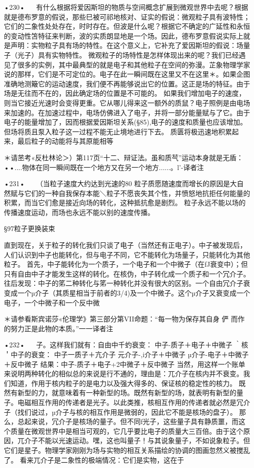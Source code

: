 •230•
  
有什么根据将爱因斯坦的物质与空间概念扩展到微观世界中去呢？根据就是德布罗意的假说，那些巳被可祁地核对、证实的假说：微观粒子具有波特性；它们的二象性处处存在，时时存在。但波是什么呢？根据它不确定的广延性和永恒的变动性笘特征来判断，波的实质朗显地是一个场。因此，德布罗意假说实际上就是声明：实物粒子具有场的特性。在这个意义上，它补充了爱因斯坦的假说：场量子（光子）具有实物特性。
微观粒子的场特性是怎样体现出来的呢？我们已经遇见了很多的实例，其中最典型的就是电子和其他粒子在空间的弥漫。芷象物理学家说的那样，它们是不可定位的。电子在此一瞬间既在这里又不在这里＊。如果企图准确地测簸它的运动速度，我们便不再能够说出它的位置。这正是场的特征。由于场是无往而不在的，因此确定场的位置是不可能的。
如果我们增加电子的速度，则当它接近光速时会变得更重。它从哪儿得来这一额外的质鼠？电子照例是由电场来加速的。在加速过程中，电场仿佛进入了电子，并将一部分能量赋与了它。由于电子的能量增加了，因而根据爱因斯坦关系(§85),电子的速度和质量也应该增加。
但场将质且泵入粒子这一过程不能无止境地进行下去。
质匮将极迅速地积累起来，最后粒子的动能将与其原能相等

＊请苤考«反杜林论＞）第117页“十二、辩证法。虽和质芞”运动本身就是无盾：••....物体在同一瞬间既在一个地方又在另一个地方......。l'-译者注

•231•
  
（当粒子速度大约达到光速的80%
粒子质愿随速度而增长的原因是大自然赋与它们的一种自我保存本能＼粒子不愿丧失其个性，并愤怒地抗拒任何能量的积累，而当它们愈是接近向场的转化，这种抵抗愈是剧烈。
粒子永远不能以场的传播速度运动，而场也永远不能以别的速度传播。

§97粒子更换装束

直到现在，关于粒子的转化我们只谈了电子（当然还有正电子）。中子被发现后，人们认识到中子也能转化，但与电子不同，它不能转化为场量子，只能转化为其他粒子。
首先，中子能转化为一个质子，一个电子和一个中微子（在fJ衰变中）；但只有自由中子才能发生这样的转化。在核伪，中子转化成一个质子和一个冗介子。往后发现：中子的笫二种转化与笫一种转化并没有很大的区别。一个自由冗介子衰变成一个µ介子（其质星相当于前者的3/4)及一个中微子。这个µ介子又衰变成一个电子，一个中微子和一个反中微

＊请参看斯宾诺莎«伦理学》第三部分第VII命题：“每一物为保存其自身
	俨	而作的努力正是此物的本质。”一一译者注

•232•
  
子。这样我们就有：自由中千虳衰变：
中子-质子＋电子＋中微子
｀核＇中子的衰变：
中子一质子＋亢介子
元介子-,i介子＋中微子
µ介子-电子＋中微子＋反中微子
结果：中子-质子＋电子+2中微子＋反中微子
当然，用这样一个账单来说明两种转化的相似总的来说是行不通的，理由是：兀介子在核内并不衰变。我们知道，作用于核内粒子的是电力以及强大得多的、保证核的稳定性的核力。
既然有新型的力，就意味着有一种新型的场。既然有新型的场，就表明有新型的量子。电磁相互作用的传递者是光子。以此类推，核相互作用的传递者就必然是冗介子（找们说过，µ介子与核的相互作用是微弱的，因此它不能是核场的盘子）。
那么，总起来说，冗介子是核场的量子。但不同f光子，这些量子具有静质噩，而这个质量在微观世界中是相当可观的，它几乎要比电子的质量大三百倍。由于这个原因，兀介子不能以光速运动。嘿，这也叫量子！与其说象量子，不如说象粒子。但它们是星子。物理学家刚刚为场与实物的相互关系描绘的协调的图画忽然义被搅乱了。
看来兀介子是二象性的极端情况：它们是实物，这在于

